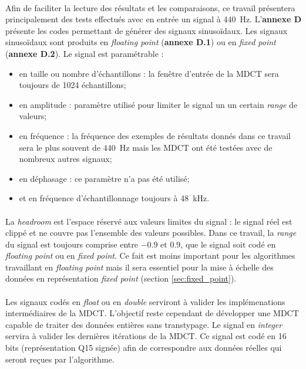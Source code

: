 \documentclass{article}
\begin{document}
    \paragraph{}
    Afin de faciliter la lecture des résultats et les comparaisons, ce travail présentera principalement des tests effectués avec en entrée un signal à \SI{440}{\hertz}. L'\textbf{annexe D} présente les codes permettant de générer des signaux sinusoïdaux. Les signaux sinusoïdaux sont produits en \emph{floating point} (\textbf{annexe D.1}) ou en \emph{fixed point} (\textbf{annexe D.2}). Le signal est paramétrable :
    \begin{itemize}
        \item en taille ou nombre d'échantillons : la fenêtre d'entrée de la MDCT sera toujours de 1024 échantillons;
        \item en amplitude : paramètre utilisé pour limiter le signal un un certain \emph{range} de valeurs;
        \item en fréquence : la fréquence des exemples de résultats donnés dans ce travail sera le plus souvent de \SI{440}{\hertz} mais les MDCT ont été testées avec de nombreux autres signaux;
        \item en déphasage : ce paramètre n'a pas été utilisé;
        \item et en fréquence d'échantillonnage toujours à \SI{48}{\kilo\hertz}.
    \end{itemize}

    \paragraph{}
    La \emph{headroom} est l'espace réservé aux valeurs limites du signal : le signal réel est clippé et ne couvre pas l'ensemble des valeurs possibles. Dans ce travail, la \emph{range} du signal est toujours comprise entre $-0.9$ et $0.9$, que le signal soit codé en \emph{floating point} ou en \emph{fixed point}. Ce fait est moins important pour les algorithmes travaillant en \emph{floating point} mais il sera essentiel pour la mise à échelle des données en représentation \emph{fixed point} (section \ref{sec:fixed_point}).

    \paragraph{}
    Les signaux codés en \emph{float} ou en \emph{double} serviront à valider les implémenations intermédiaires de la MDCT. L'objectif reste cependant de développer une MDCT capable de traiter des données entières sans transtypage. Le signal en \emph{integer} servira à valider les dernières itérations de la MDCT. Ce signal est codé en 16 bits (représentation Q15 signée) afin de correspondre aux données réelles qui seront reçues par l'algorithme.
\end{document}
